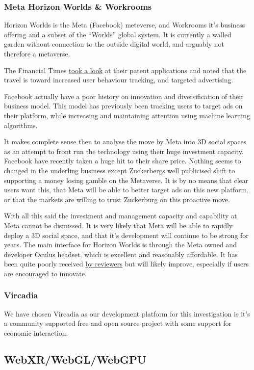 \subsubsection{Meta Horizon Worlds \& Workrooms}
Horizon Worlds is the Meta (Facebook) meteverse, and Workrooms it's business offering and a subset of the ``Worlds'' global system. It is currently a walled garden without connection to the outside digital world, and arguably not therefore a metaverse.\par
The Financial Times \href{}{took a look} at their patent applications and noted that the travel is toward increased user behaviour tracking, and targeted advertising.\par
Facebook actually have a poor history on innovation and diversification of their business model. This model has previously been tracking users to target ads on their platform, while increasing and maintaining attention using machine learning algorithms. \par
It makes complete sense then to analyse the move by Meta into 3D social spaces as an attempt to front run the technology using their huge investment capacity. Facebook have recently taken a huge hit to their share price. Nothing seems to changed in the underling business except Zuckerbergs well publicised shift to supporting a money losing gamble on the Metaverse. It is by no means that clear users want this, that Meta will be able to better target ads on this new platform, or that the markets are willing to trust Zuckerburg on this proactive move. \par
With all this said the investment and management capacity and capability at Meta cannot be dismissed. It is very likely that Meta will be able to rapidly deploy a 3D social space, and that it's development will continue to be strong for years. The main interface for Horizon Worlds is through the Meta owned and developer Oculus headset, which is excellent and reasonably affordable. It has been quite poorly received \href{https://kotaku.com/facebook-metaverse-horizon-worlds-vr-oculus-quest-2-cha-1848436740}{by reviewers} but will likely improve, especially if users are encouraged to innovate.
\subsubsection{Vircadia}
We have chosen Vircadia as our development platform for this investigation is it's a community supported free and open source project with some support for economic interaction.
\subsection{WebXR/WebGL/WebGPU}
